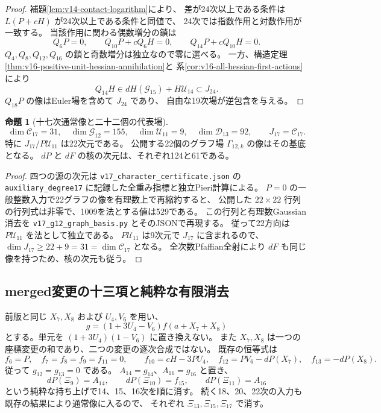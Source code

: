 \documentclass[a4paper,11pt]{ltjsarticle}
\theoremstyle{definition}
\newtheorem{proposition}[theorem]{命題}
\begin{document}
\begin{proof}
補題\ref{lem:v14-contact-logarithm}により、
差が24次以上である条件は $L(P+cH)$ が24次以上である条件と同値で、
24次では指数作用と対数作用が一致する。
当該作用に関わる偶数増分の鎖は
\[
 Q_6P=0,\qquad Q_{10}P+cQ_6H=0,\qquad
 Q_{14}P+cQ_{10}H=0.
\]
$Q_4,Q_8,Q_{12},Q_{16}$ の鎖と奇数増分は独立なので零に選べる。
一方、構造定理\ref{thm:v16-positive-unit-hessian-annihilation}と
系\ref{cor:v16-all-hessian-first-actions}により
\[
 Q_{14}H\in dH(\mathcal G_{15})+H\mathcal U_{14}\subset J_{24}.
\]
$Q_{18}P$ の像はEuler場を含めて $J_{24}$ であり、
自由な19次場が逆包含を与える。
\end{proof}

\begin{proposition}[十七次通常像と二十二個の代表場]
\label{prop:v17-seventeenth-contact-basis}
\[
 \dim\mathcal C_{17}=31,\quad
 \dim\mathcal G_{12}=155,\quad
 \dim\mathcal U_{11}=9,\quad
 \dim\mathcal D_{13}=92,\qquad
                           J_{17}=\mathcal C_{17}.
\]
特に $J_{17}/P\mathcal U_{11}$ は22次元である。
公開する22個のグラフ場 $\Gamma_{12,k}$ の像はその基底となる。
$dP$ と $dF$ の核の次元は、それぞれ124と61である。
\end{proposition}

\begin{proof}
四つの源の次元は
\nolinkurl{v17_character_certificate.json} の
\texttt{auxiliary\_degree17} に記録した全重み指標と独立Pieri計算による。
$P=0$ の一般整数入力で22グラフの像を有理数上で再縮約すると、
公開した $22\times22$ 行列の行列式は非零で、1009を法とする値は529である。
この行列と有理数Gaussian消去を
\nolinkurl{v17_g12_graph_basis.py} とそのJSONで再現する。
従って22方向は $P\mathcal U_{11}$ を法として独立である。
$P\mathcal U_{11}$ は9次元で $J_{17}$ に含まれるので、
$\dim J_{17}\ge22+9=31=\dim\mathcal C_{17}$ となる。
全次数Pfaffian全射により $dF$ も同じ像を持つため、核の次元も従う。
\end{proof}

\subsection{merged変更の十三項と純粋な有限消去}

前版と同じ $X_7,X_8$ および $U_4,V_6$ を用い、
\[
               g=(1+3U_4-V_6)f(a+X_7+X_8)
\]
とする。単元を $(1+3U_4)(1-V_6)$ に置き換えない。
また $X_7,X_8$ は一つの座標変更の和であり、二つの変更の逐次合成ではない。
既存の恒等式は
\[
 f_6=P,\quad f_7=f_8=f_9=f_{11}=0,\qquad
 f_{10}=cH-3PU_4,\quad f_{12}=PV_6-dP(X_7),\quad f_{13}=-dP(X_8).
\]
従って $g_{12}=g_{13}=0$ である。
$A_{14}=g_{14}$、$A_{16}=g_{16}$ と置き、
\[
 dP(\Xi_9)=A_{14},\qquad dP(\Xi_{10})=f_{15},\qquad
 dP(\Xi_{11})=A_{16}
\]
という純粋な持ち上げで14、15、16次を順に消す。
続く18、20、22次の入力も既存の結果により通常像に入るので、
それぞれ $\Xi_{13},\Xi_{15},\Xi_{17}$ で消す。
\end{document}

